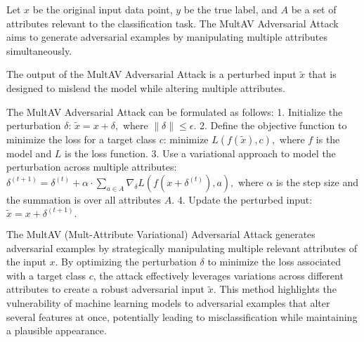 Let \( x \) be the original input data point, \( y \) be the true label, and \( A \) be a set of attributes relevant to the classification task. The MultAV Adversarial Attack aims to generate adversarial examples by manipulating multiple attributes simultaneously.

The output of the MultAV Adversarial Attack is a perturbed input \( \tilde{x} \) that is designed to mislead the model while altering multiple attributes.

The MultAV Adversarial Attack can be formulated as follows:
1. Initialize the perturbation \( \delta \):
   $
   \tilde{x} = x + \delta,
   $
   where \( \|\delta\| \leq \epsilon \).
2. Define the objective function to minimize the loss for a target class \( c \):
   $
   \text{minimize } L(f(\tilde{x}), c),
   $
   where \( f \) is the model and \( L \) is the loss function.
3. Use a variational approach to model the perturbation across multiple attributes:
   $
   \delta^{(t+1)} = \delta^{(t)} + \alpha \cdot \sum_{a \in A} \nabla_{\delta} L(f(x + \delta^{(t)}), a),
   $
   where \( \alpha \) is the step size and the summation is over all attributes \( A \).
4. Update the perturbed input:
   $
   \tilde{x} = x + \delta^{(t+1)}.
   $

The MultAV (Mult-Attribute Variational) Adversarial Attack generates adversarial examples by strategically manipulating multiple relevant attributes of the input \( x \). By optimizing the perturbation \( \delta \) to minimize the loss associated with a target class \( c \), the attack effectively leverages variations across different attributes to create a robust adversarial input \( \tilde{x} \). This method highlights the vulnerability of machine learning models to adversarial examples that alter several features at once, potentially leading to misclassification while maintaining a plausible appearance.
